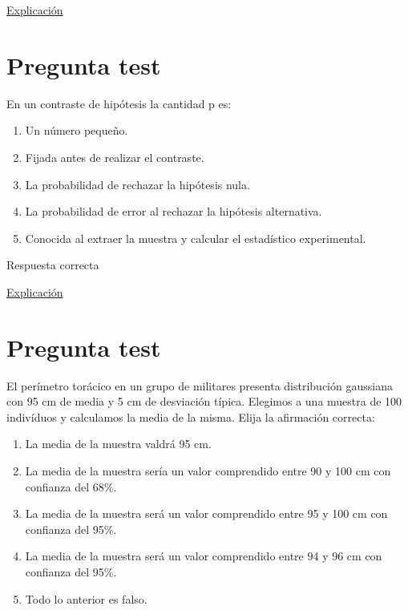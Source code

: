\documentclass[
]{book}
\providecommand{\tightlist}{%
  \setlength{\itemsep}{0pt}\setlength{\parskip}{0pt}}
\begin{document}
\href{https://1fjmanzano.github.io/bioestadistica/estimacio\%CC\%81n-de-para\%CC\%81metros.-intervalos-de-confianza.html}{Explicación}

\hypertarget{pregunta-test-99}{%
\section{Pregunta test}\label{pregunta-test-99}}

En un contraste de hipótesis la cantidad p es:

\begin{enumerate}
\def\labelenumi{\alph{enumi})}
\tightlist
\item
  Un número pequeño.
\item
  Fijada antes de realizar el contraste.
\item
  La probabilidad de rechazar la hipótesis nula.
\item
  La probabilidad de error al rechazar la hipótesis alternativa.
\item
  Conocida al extraer la muestra y calcular el estadístico experimental.
\end{enumerate}

Respuesta correcta

\href{https://1fjmanzano.github.io/bioestadistica/valor-p.html}{Explicación}

\hypertarget{pregunta-test-100}{%
\section{Pregunta test}\label{pregunta-test-100}}

El perímetro torácico en un grupo de militares presenta distribución gaussiana con 95 cm de media y 5 cm de desviación típica. Elegimos a una muestra de 100 indivíduos y calculamos la media de la misma. Elija la afirmación correcta:

\begin{enumerate}
\def\labelenumi{\alph{enumi})}
\tightlist
\item
  La media de la muestra valdrá 95 cm.
\item
  La media de la muestra sería un valor comprendido entre 90 y 100 cm con confianza del 68\%.
\item
  La media de la muestra será un valor comprendido entre 95 y 100 cm con confianza del 95\%.
\item
  La media de la muestra será un valor comprendido entre 94 y 96 cm con confianza del 95\%.
\item
  Todo lo anterior es falso.
\end{enumerate}
\end{document}
